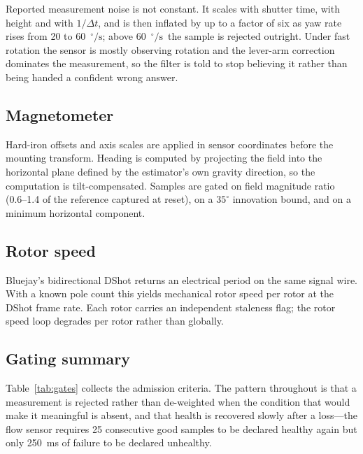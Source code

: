 \documentclass[conference]{IEEEtran}
\newcommand{\dps}{\ensuremath{^{\circ}\!/\mathrm{s}}}
\begin{document}
Reported measurement noise is not constant. It scales with shutter time, with
height and with $1/\Delta t$, and is then inflated by up to a factor of six as
yaw rate rises from 20 to 60~\dps; above 60~\dps\ the sample is rejected
outright. Under fast rotation the sensor is mostly observing rotation and the
lever-arm correction dominates the measurement, so the filter is told to stop
believing it rather than being handed a confident wrong answer.

\subsection{Magnetometer}

Hard-iron offsets and axis scales are applied in sensor coordinates before the
mounting transform. Heading is computed by projecting the field into the
horizontal plane defined by the estimator's own gravity direction, so the
computation is tilt-compensated. Samples are gated on field magnitude ratio
(0.6--1.4 of the reference captured at reset), on a $35^{\circ}$ innovation
bound, and on a minimum horizontal component.

\subsection{Rotor speed}

Bluejay's bidirectional DShot returns an electrical period on the same signal
wire. With a known pole count this yields mechanical rotor speed per rotor at
the DShot frame rate. Each rotor carries an independent staleness flag; the
rotor speed loop degrades per rotor rather than globally.

\subsection{Gating summary}

Table~\ref{tab:gates} collects the admission criteria. The pattern throughout
is that a measurement is rejected rather than de-weighted when the condition
that would make it meaningful is absent, and that health is recovered slowly
after a loss---the flow sensor requires 25 consecutive good samples to be
declared healthy again but only 250~ms of failure to be declared unhealthy.
\end{document}
